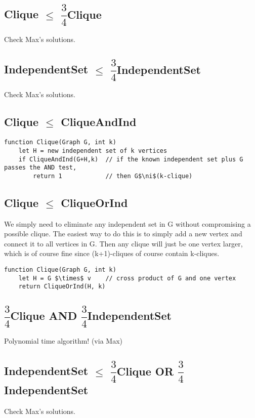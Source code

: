 \documentclass[12pt]{article}
\providecommand{\reducible}[2]{
  \textbf{#1} $\leq$ \textbf{#2}
}
\begin{document}
\subsection{\reducible{Clique}{$\dfrac{3}{4}$Clique}}
Check Max's solutions.

\subsection{\reducible{IndependentSet}{$\dfrac{3}{4}$IndependentSet}}
Check Max's solutions.


\subsection{\reducible{Clique}{CliqueAndInd}}
\begin{lstlisting}
function Clique(Graph G, int k)
    let H = new independent set of k vertices
    if CliqueAndInd(G+H,k)  // if the known independent set plus G passes the AND test,
        return 1            // then G$\ni$(k-clique)
\end{lstlisting}


\subsection{\reducible{Clique}{CliqueOrInd}}
We simply need to eliminate any independent set in G without compromising a possible clique.
The easiest way to do this is to simply add a new vertex and connect it to all vertices in G.
Then any clique will just be one vertex larger, which is of course fine since (k+1)-cliques of course contain k-cliques.
\begin{lstlisting}
function Clique(Graph G, int k)
    let H = G $\times$ v    // cross product of G and one vertex
    return CliqueOrInd(H, k)
\end{lstlisting}


\subsection{$\dfrac{3}{4}$Clique AND $\dfrac{3}{4}$IndependentSet}
Polynomial time algorithm! (via Max)

\subsection{\reducible{IndependentSet}{$\dfrac{3}{4}$Clique OR $\dfrac{3}{4}$IndependentSet}}
Check Max's solutions.
\end{document}
